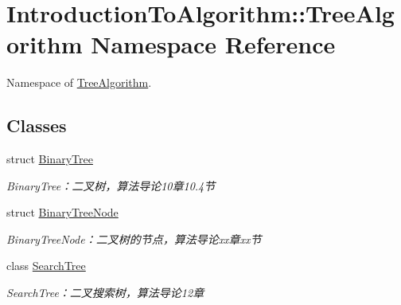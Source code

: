 \hypertarget{namespace_introduction_to_algorithm_1_1_tree_algorithm}{}\section{Introduction\+To\+Algorithm\+:\+:Tree\+Algorithm Namespace Reference}
\label{namespace_introduction_to_algorithm_1_1_tree_algorithm}


Namespace of \hyperlink{namespace_introduction_to_algorithm_1_1_tree_algorithm}{Tree\+Algorithm}.  


\subsection*{Classes}
\begin{DoxyCompactItemize}
\item 
struct \hyperlink{struct_introduction_to_algorithm_1_1_tree_algorithm_1_1_binary_tree}{Binary\+Tree}
\begin{DoxyCompactList}\small\item\em Binary\+Tree：二叉树，算法导论10章10.4节 \end{DoxyCompactList}\item 
struct \hyperlink{struct_introduction_to_algorithm_1_1_tree_algorithm_1_1_binary_tree_node}{Binary\+Tree\+Node}
\begin{DoxyCompactList}\small\item\em Binary\+Tree\+Node：二叉树的节点，算法导论xx章xx节 \end{DoxyCompactList}\item 
class \hyperlink{class_introduction_to_algorithm_1_1_tree_algorithm_1_1_search_tree}{Search\+Tree}
\begin{DoxyCompactList}\small\item\em Search\+Tree：二叉搜索树，算法导论12章 \end{DoxyCompactList}\end{DoxyCompactItemize}
